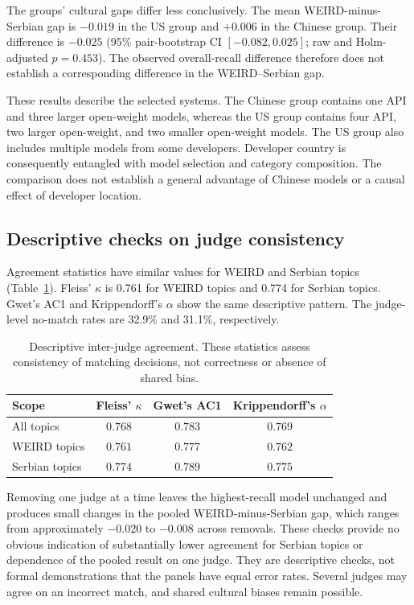 The groups' cultural gaps differ less conclusively. The mean
WEIRD-minus-Serbian gap is $-0.019$ in the US group and $+0.006$
in the Chinese group. Their difference is $-0.025$ (95\% pair-bootstrap
CI $[-0.082,0.025]$; raw and Holm-adjusted $p=0.453$). The observed
overall-recall difference therefore does not establish a corresponding
difference in the WEIRD--Serbian gap.

These results describe the selected systems. The Chinese group contains
one API and three larger open-weight models, whereas the US group contains
four API, two larger open-weight, and two smaller open-weight models.
The US group also includes multiple models from some developers. Developer country
is consequently entangled with model selection and category composition.
The comparison does not establish a general advantage of Chinese models
or a causal effect of developer location.

\subsection{Descriptive checks on judge consistency}
\label{sec:judge-checks}
Agreement statistics have similar values for WEIRD and Serbian topics
(Table~\ref{tab:judge-checks}). Fleiss' $\kappa$ is 0.761 for WEIRD
topics and 0.774 for Serbian topics. Gwet's AC1 and Krippendorff's
$\alpha$ show the same descriptive pattern. The judge-level no-match
rates are 32.9\% and 31.1\%, respectively.

\begin{table}[H]
\centering
\small
\caption{Descriptive inter-judge agreement. These statistics assess
consistency of matching decisions, not correctness or absence of shared bias.}
\label{tab:judge-checks}
\begin{tabular}{lccc}
\toprule
Scope & Fleiss' $\kappa$ & Gwet's AC1 & Krippendorff's $\alpha$\\
\midrule
All topics & $0.768$ & $0.783$ & $0.769$\\
WEIRD topics & $0.761$ & $0.777$ & $0.762$\\
Serbian topics & $0.774$ & $0.789$ & $0.775$\\
\bottomrule
\end{tabular}
\end{table}

Removing one judge at a time leaves the highest-recall model unchanged
and produces small changes in the pooled WEIRD-minus-Serbian gap,
which ranges from approximately $-0.020$ to $-0.008$ across removals.
These checks provide no obvious indication of substantially lower
agreement for Serbian topics or dependence of the pooled result on
one judge. They are descriptive checks, not formal demonstrations that
the panels have equal error rates. Several judges may agree on an
incorrect match, and shared cultural biases remain possible.

